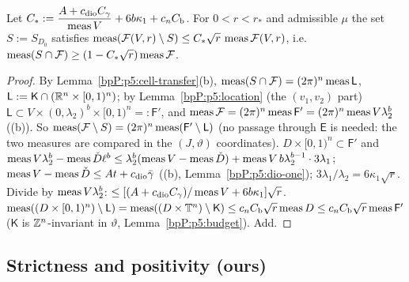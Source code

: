 \begin{proposition}\label{bpP:p5:lower}
Let $C_*:=\dfrac{A+c_{\rm dio}C_\gamma}{\operatorname{meas} V}+6b\kappa_1+c_nC_{\rm b}$. For $0<r<r_*$ and admissible $\mu$ the set $S:=S_{D_0}$ satisfies $\operatorname{meas}(\mathcal F(V,r)\setminus S)\le C_*\sqrt r\,\operatorname{meas}\mathcal F(V,r)$, i.e. $\operatorname{meas}(S\cap\mathcal F)\ge(1-C_*\sqrt r)\operatorname{meas}\mathcal F$.
\end{proposition}
\begin{proof}
\label{stepP:p5:lo-setup} By Lemma~\ref{bpP:p5:cell-transfer}(b), $\operatorname{meas}(S\cap\mathcal F)=(2\pi)^n\operatorname{meas}\mathsf L$, $\mathsf L:=\mathsf K\cap(\mathbb{R}^n\times[0,1)^n)$; by Lemma~\ref{bpP:p5:location} (the $(v_1,v_2)$ part) $\mathsf L\subset V\times(0,\lambda_2)^b\times[0,1)^n=:\mathsf F'$, and $\operatorname{meas}\mathcal F=(2\pi)^n\operatorname{meas}\mathsf F'=(2\pi)^n\operatorname{meas} V\lambda_2^b$ ((b)). So $\operatorname{meas}(\mathcal F\setminus S)=(2\pi)^n\operatorname{meas}(\mathsf F'\setminus\mathsf L)$ (no passage through $\mathsf E$ is needed: the two measures are compared in the $(J,\vartheta)$ coordinates).
\label{stepP:p5:lo-bad} $D\times[0,1)^n\subset\mathsf F'$ and $\operatorname{meas} V\lambda_2^b-\operatorname{meas}\check D\ell^b\le\lambda_2^b(\operatorname{meas} V-\operatorname{meas}\check D)+\operatorname{meas} V\,b\lambda_2^{b-1}\cdot3\lambda_1$; $\operatorname{meas} V-\operatorname{meas}\check D\le At+c_{\rm dio}\bar\gamma$ ((b), Lemma~\ref{bpP:p5:dio-one}); $3\lambda_1/\lambda_2=6\kappa_1\sqrt r$. Divide by $\operatorname{meas} V\lambda_2^b$: $\le[(A+c_{\rm dio}C_\gamma)/\operatorname{meas} V+6b\kappa_1]\sqrt r$.
\label{stepP:p5:lo-lost} $\operatorname{meas}((D\times[0,1)^n)\setminus\mathsf L)=\operatorname{meas}((D\times\mathbb{T}^n)\setminus\mathsf K)\le c_nC_{\rm b}\sqrt r\operatorname{meas} D\le c_nC_{\rm b}\sqrt r\operatorname{meas}\mathsf F'$ ($\mathsf K$ is $\mathbb{Z}^n$-invariant in $\vartheta$, Lemma~\ref{bpP:p5:budget}). Add.
\end{proof}

\subsection{Strictness and positivity (ours)}\label{bpP:p5:strict}

